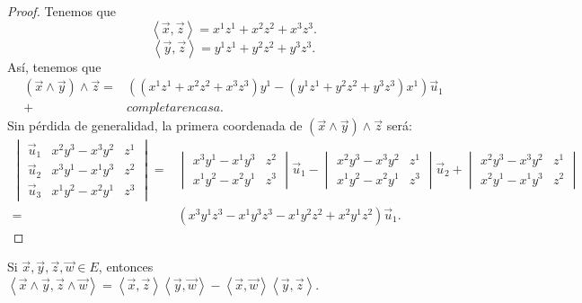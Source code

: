 \begin{proof}
Tenemos que 
\[\left\langle \vec{x}, \vec{z} \right\rangle = x^{1}z^{1}+x^{2}z^{2}+x^{3}z^{3} .\]
\[\left\langle \vec{y}, \vec{z} \right\rangle = y^{1}z^{1}+y^{2}z^{2}+y^{3}z^{3} .\]
Así, tenemos que 
\[
\begin{split}
	\left(\vec{x}\land\vec{y}\right)\land\vec{z} = & \left(\left(x^{1}z^{1}+x^{2}z^{2}+x^{3}z^{3}\right)y^{1}-\left(y^{1}z^{1}+y^{2}z^{2}+y^{3}z^{3}\right)x^{1}\right) \vec{u}_{1} \\
	+ & completar en casa.
\end{split}
\]
Sin pérdida de generalidad, la primera coordenada de $\displaystyle \left(\vec{x} \land \vec{y}\right)\land\vec{z} $ será:
\[
\begin{split}
 \begin{vmatrix} \vec{u}_{1} & x^{2}y^{3}-x^{3}y^{2} & z^{1} \\
\vec{u}_{2} & x^{3}y^{1}-x^{1}y^{3} & z^{2} \\
\vec{u}_{3} & x^{1}y^{2}-x^{2}y^{1} & z^{3}\end{vmatrix} = & \begin{vmatrix} x^{3}y^{1}-x^{1}y^{3} & z^{2} \\ x^{1}y^{2}-x^{2}y^{1} & z^{3} \end{vmatrix} \vec{u}_{1} - \begin{vmatrix} x^{2}y^{3}-x^{3}y^{2} & z^{1} \\ x^{1}y^{2} -x^{2}y^{1} & z^{3} \end{vmatrix} \vec{u}_{2} + \begin{vmatrix} x^{2}y^{3}-x^{3}y^{2} & z^{1} \\ x^{2}y^{1}-x^{1}y^{3} & z^{2} \end{vmatrix} \\
= & \left(x^{3}y^{1}z^{3}-x^{1}y^{3}z^{3}-x^{1}y^{2}z^{2}+x^{2}y^{1}z^{2}\right)\vec{u}_{1}.
\end{split}
\]
\end{proof}
\begin{ftheorem}[]
\normalfont Si $\displaystyle \vec{x}, \vec{y}, \vec{z}, \vec{w} \in E $, entonces $\displaystyle \left\langle \vec{x}\land\vec{y}, \vec{z}\land\vec{w} \right\rangle = \left\langle \vec{x}, \vec{z} \right\rangle \left\langle \vec{y}, \vec{w} \right\rangle -\left\langle \vec{x}, \vec{w} \right\rangle \left\langle \vec{y}, \vec{z} \right\rangle  $.
\end{ftheorem}
